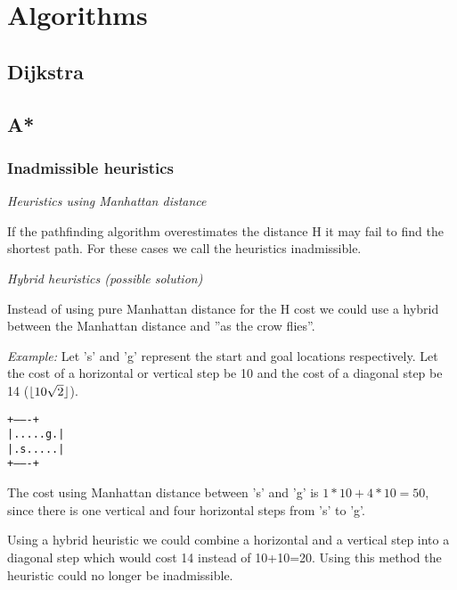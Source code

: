 \documentclass[12pt, a4paper]{article}
\DeclarePairedDelimiter{\floor}{\lfloor}{\rfloor}
\begin{document}
\section{Algorithms}


\subsection{Dijkstra}


\subsection{A*}


\subsubsection{Inadmissible heuristics}

\textit{Heuristics using Manhattan distance}

If the pathfinding algorithm overestimates the distance H it may fail to find
the shortest path. For these cases we call the heuristics inadmissible.
\cite{astar2}

\textit{Hybrid heuristics (possible solution)}

Instead of using pure Manhattan distance for the H cost we could use a hybrid
between the Manhattan distance and ''as the crow flies''.

\textit{Example:} Let 's' and 'g' represent the start and goal locations
respectively. Let the cost of a horizontal or vertical step be 10 and the cost
of a diagonal step be 14 ($ \floor{10 \sqrt{2}} $).

\texttt{+-------+ \\
|.....g.| \\
|.s.....| \\
+-------+}

The cost using Manhattan distance between 's' and 'g' is $ 1*10 + 4*10 = 50 $,
since there is one vertical and four horizontal steps from 's' to 'g'.

Using a hybrid heuristic we could combine a horizontal and a vertical step into
a diagonal step which would cost 14 instead of 10+10=20. Using this method the
heuristic could no longer be inadmissible.
\end{document}
